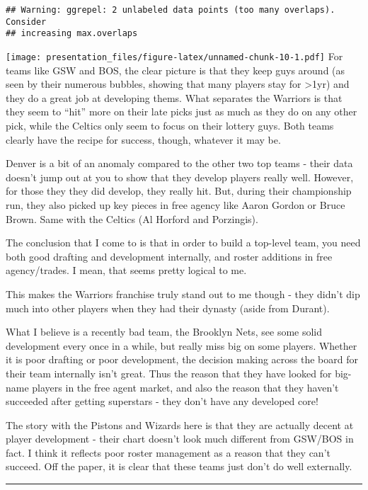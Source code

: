 \documentclass[
]{article}
\begin{document}
\begin{verbatim}
## Warning: ggrepel: 2 unlabeled data points (too many overlaps). Consider
## increasing max.overlaps
\end{verbatim}

\texttt{[image: presentation\_files/figure-latex/unnamed-chunk-10-1.pdf]}
For teams like GSW and BOS, the clear picture is that they keep guys
around (as seen by their numerous bubbles, showing that many players
stay for \textgreater1yr) and they do a great job at developing thems.
What separates the Warriors is that they seem to ``hit'' more on their
late picks just as much as they do on any other pick, while the Celtics
only seem to focus on their lottery guys. Both teams clearly have the
recipe for success, though, whatever it may be.

Denver is a bit of an anomaly compared to the other two top teams -
their data doesn't jump out at you to show that they develop players
really well. However, for those they they did develop, they really hit.
But, during their championship run, they also picked up key pieces in
free agency like Aaron Gordon or Bruce Brown. Same with the Celtics (Al
Horford and Porzingis).

The conclusion that I come to is that in order to build a top-level
team, you need both good drafting and development internally, and roster
additions in free agency/trades. I mean, that seems pretty logical to
me.

This makes the Warriors franchise truly stand out to me though - they
didn't dip much into other players when they had their dynasty (aside
from Durant).

What I believe is a recently bad team, the Brooklyn Nets, see some solid
development every once in a while, but really miss big on some players.
Whether it is poor drafting or poor development, the decision making
across the board for their team internally isn't great. Thus the reason
that they have looked for big-name players in the free agent market, and
also the reason that they haven't succeeded after getting superstars -
they don't have any developed core!

The story with the Pistons and Wizards here is that they are actually
decent at player development - their chart doesn't look much different
from GSW/BOS in fact. I think it reflects poor roster management as a
reason that they can't succeed. Off the paper, it is clear that these
teams just don't do well externally.

\begin{center}\rule{0.5\linewidth}{0.5pt}\end{center}
\end{document}
